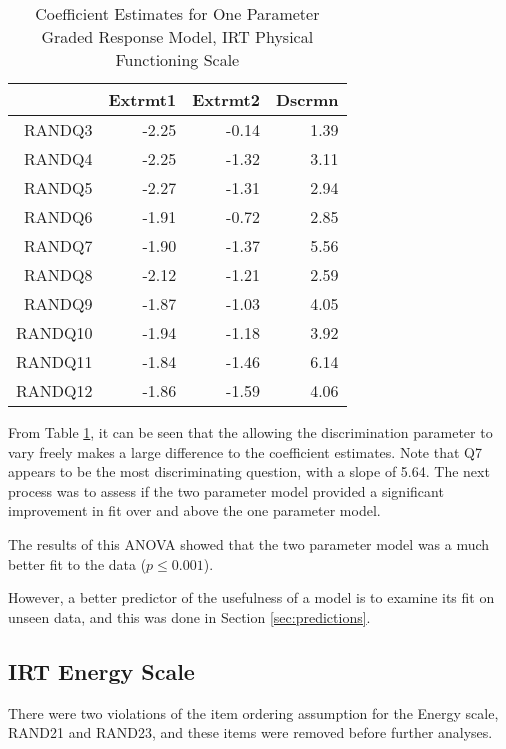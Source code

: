 \documentclass{article}
\begin{document}
\begin{table}[ht]
\centering
\begin{tabular}{rrrr}
  \hline
 & Extrmt1 & Extrmt2 & Dscrmn \\ 
  \hline
RANDQ3 & -2.25 & -0.14 & 1.39 \\ 
  RANDQ4 & -2.25 & -1.32 & 3.11 \\ 
  RANDQ5 & -2.27 & -1.31 & 2.94 \\ 
  RANDQ6 & -1.91 & -0.72 & 2.85 \\ 
  RANDQ7 & -1.90 & -1.37 & 5.56 \\ 
  RANDQ8 & -2.12 & -1.21 & 2.59 \\ 
  RANDQ9 & -1.87 & -1.03 & 4.05 \\ 
  RANDQ10 & -1.94 & -1.18 & 3.92 \\ 
  RANDQ11 & -1.84 & -1.46 & 6.14 \\ 
  RANDQ12 & -1.86 & -1.59 & 4.06 \\ 
   \hline
\end{tabular}
\caption{Coefficient Estimates for One Parameter Graded Response Model, IRT Physical Functioning Scale} 
\label{tab:randphysfungrm2pl}
\end{table}

From Table \ref{tab:randphysfungrm2pl}, it can be seen that the allowing the discrimination parameter to vary freely makes a large difference to the coefficient estimates. Note that Q7 appears to be the most discriminating question, with a slope of 5.64. The next process was to assess if the two parameter model provided a significant improvement in fit over and above the one parameter model.

The results of this ANOVA showed that the two parameter model was a much better fit to the data ($p \le 0.001$). 


However, a better predictor of the usefulness of a model is to examine its fit on unseen data, and this was done in Section \ref{sec:predictions}. 


\subsection{IRT Energy Scale}
\label{sec:irt-energy-scale}





There were two violations of the item ordering assumption for the Energy scale, RAND21 and RAND23, and these items were removed before further analyses.
\end{document}
